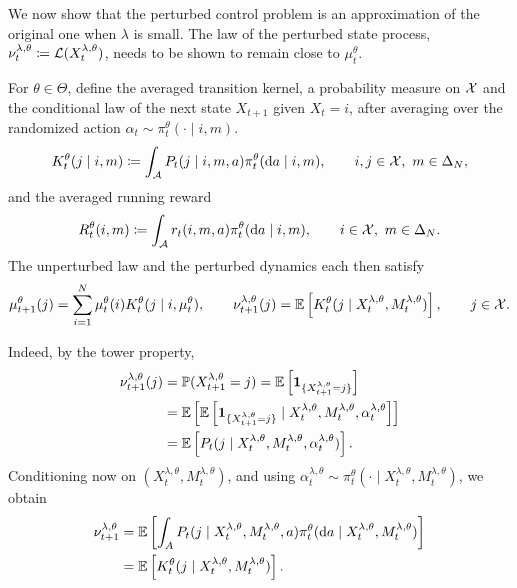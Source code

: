 We now show that the perturbed control problem is an approximation of the original one when $\lambda$ is small. The law of the perturbed state process, $\nu_t^{\lambda,\theta}\coloneqq {\cal L}(X_t^{\lambda,\theta})$, needs to be shown to remain close to $\mu_t^\theta$.

For $\theta\in\Theta$, define the averaged transition kernel, a probability measure on ${\cal X}$ and the conditional law of the next state $X_{t+1}$ given $X_t = i$, after averaging over the randomized action $\alpha_t\sim\pi_t^\theta(\cdot\mid i,m)$.
\begin{align}
    K_t^\theta(j\mid i,m) \coloneqq \int_{\cal A} P_t(j\mid i,m,a) \pi_t^\theta(\mathrm{d} a\mid i,m),\qquad i,j\in{\cal X},\ m\in\Delta_N,
\end{align}
and the averaged running reward
\begin{align}
    R_t^\theta(i,m)\coloneqq \int_{\cal A} r_t(i,m,a)\pi_t^\theta(\mathrm{d} a\mid i,m),\qquad i\in{\cal X},\ m\in\Delta_N.
\end{align}
The unperturbed law and the perturbed dynamics each then satisfy
\begin{align}
    \mu_{t+1}^\theta(j) = \sum_{i=1}^N \mu_t^\theta(i) K_t^\theta(j\mid i,\mu_t^\theta),\qquad
    \nu_{t+1}^{\lambda,\theta}(j) = \mathbb{E}\left[K_t^\theta(j\mid X_t^{\lambda,\theta}, M_t^{\lambda,\theta}) \right],\qquad
    j\in{\cal X}.
\end{align}

Indeed, by the tower property,
\begin{align}
    \nu_{t+1}^{\lambda,\theta}(j)
    &= \mathbb{P}(X_{t+1}^{\lambda,\theta}=j) = \mathbb{E}\left[\mathbf 1_{\{X_{t+1}^{\lambda,\theta}=j \}} \right] \\
    &= \mathbb{E}\left[\mathbb{E}\left[\mathbf 1_{\{X_{t+1}^{\lambda,\theta}=j \}} \mid X_t^{\lambda,\theta}, M_t^{\lambda,\theta}, \alpha_t^{\lambda,\theta}\right] \right] \\
    &= \mathbb{E}\left[P_t(j\mid X_t^{\lambda,\theta}, M_t^{\lambda,\theta}, \alpha_t^{\lambda,\theta}) \right].
\end{align}
Conditioning now on $(X_t^{\lambda,\theta}, M_t^{\lambda,\theta})$, and using $\alpha_t^{\lambda,\theta} \sim \pi_t^\theta(\cdot\mid X_t^{\lambda,\theta}, M_t^{\lambda,\theta})$, we obtain
\begin{align}
    \nu_{t+1}^{\lambda,\theta}
    &= \mathbb{E}\left[\int_A P_t(j\mid X_t^{\lambda,\theta}, M_t^{\lambda,\theta}, a) \pi_t^\theta(\mathrm{d} a\mid X_t^{\lambda,\theta},M_t^{\lambda,\theta}) \right] \\
    &= \mathbb{E}\left[K_t^\theta(j\mid X_t^{\lambda,\theta}, M_t^{\lambda,\theta}) \right].
\end{align}

